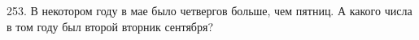 253. В некотором году в мае было четвергов больше, чем пятниц. А какого числа в том году был второй вторник сентября?\\

